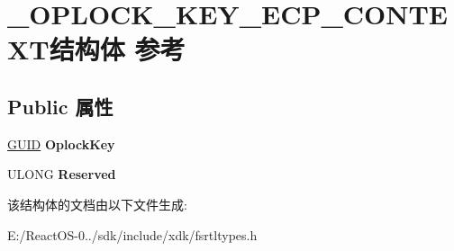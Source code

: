 \hypertarget{struct___o_p_l_o_c_k___k_e_y___e_c_p___c_o_n_t_e_x_t}{}\section{\+\_\+\+O\+P\+L\+O\+C\+K\+\_\+\+K\+E\+Y\+\_\+\+E\+C\+P\+\_\+\+C\+O\+N\+T\+E\+X\+T结构体 参考}
\label{struct___o_p_l_o_c_k___k_e_y___e_c_p___c_o_n_t_e_x_t}
\subsection*{Public 属性}
\begin{DoxyCompactItemize}
\item 
\mbox{\label{struct___o_p_l_o_c_k___k_e_y___e_c_p___c_o_n_t_e_x_t_a7643de6dcc2f2e974879af7a1daf3496}} 
\hyperlink{interface_g_u_i_d}{G\+U\+ID} {\bfseries Oplock\+Key}
\item 
\mbox{\label{struct___o_p_l_o_c_k___k_e_y___e_c_p___c_o_n_t_e_x_t_ad979e0ff4d2f32aff098797598ba4b0b}} 
U\+L\+O\+NG {\bfseries Reserved}
\end{DoxyCompactItemize}


该结构体的文档由以下文件生成\+:\begin{DoxyCompactItemize}
\item 
E\+:/\+React\+O\+S-\/0../sdk/include/xdk/fsrtltypes.\+h\end{DoxyCompactItemize}
